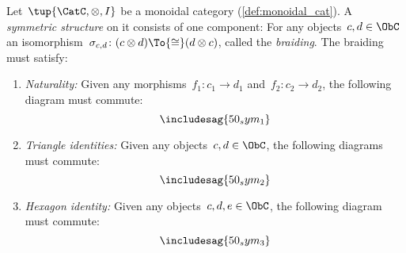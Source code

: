 \begin{ctdefinition}
    Let~$\tup{\CatC,\otimes,I}$ be a monoidal category (\cref{def:monoidal_cat}). A \emph{symmetric structure} on it consists of one component: For any objects~$c,d\in\ObC$ an isomorphism~$\sigma_{c,d}\colon (c\otimes d)\To{\cong}(d\otimes c)$, called the \emph{braiding}. The braiding must satisfy:
    \begin{enumerate}
        \item \emph{Naturality:} Given any morphisms~$f_1\colon c_1\to d_1$ and~$f_2\colon c_2\to d_2$, the following diagram must commute:
        \begin{equation}
            \includesag{50_sym_1}
        \end{equation}
        \item \emph{Triangle identities:} Given any objects~$c,d\in\ObC$, the following diagrams must commute:
        \begin{equation}
            \includesag{50_sym_2}
        \end{equation}
        \item \emph{Hexagon identity:} Given any objects~$c,d,e\in \ObC$, the following diagram must commute:
        \begin{equation}
            \includesag{50_sym_3}
        \end{equation}
    \end{enumerate}
\end{ctdefinition}
